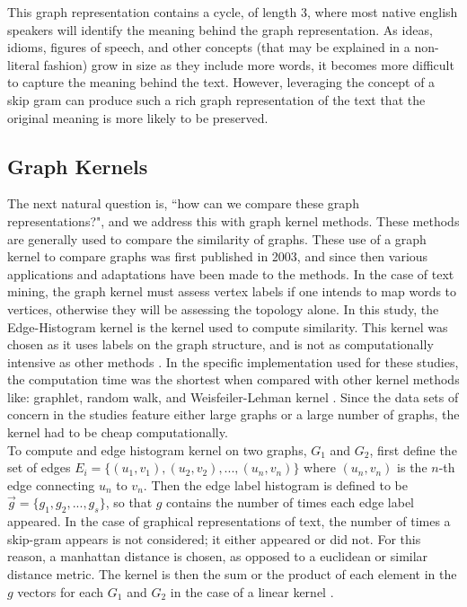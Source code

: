 This graph representation contains a cycle, of length 3, where most native english speakers will identify the meaning behind the graph representation. As ideas, idioms, figures of speech, and other concepts (that may be explained in a non-literal fashion) grow in size as they include more words, it becomes more difficult to capture the meaning behind the text. However, leveraging the concept of a skip gram can produce such a rich graph representation of the text that the original meaning is more likely to be preserved. \\

\subsection{ Graph Kernels}
\hspace*{0.3cm} The next natural question is, ``how can we compare these graph representations?", and we address this with graph kernel methods. These methods are generally used to compare the similarity of graphs. These use of a graph kernel to compare graphs was first published in 2003, and since then various applications and adaptations have been made to the methods. In the case of text mining, the graph kernel must assess vertex labels \textemdash if one intends to map words to vertices, otherwise they will be assessing the topology alone. In this study, the Edge-Histogram kernel is the kernel used to compute similarity. This kernel was chosen as it uses labels on the graph structure, and is not as computationally intensive as other methods \cite{sugiyama2015halting}. In the specific implementation used for these studies, the computation time was the shortest when compared with other kernel methods like: graphlet, random walk, and Weisfeiler-Lehman kernel \cite{sugiyama2015halting}. Since the data sets of concern in the studies feature either large graphs or a large number of graphs, the kernel had to be cheap computationally.\\

To compute and edge histogram kernel on two graphs, $G_1$ and $G_2$, first define the set of edges $E_i =\{ (u_1,v_1), (u_2,v_2), ... , (u_n,v_n) \}$ where $(u_n,v_n)$ is the $n$-th edge connecting $u_n$ to $v_n$. Then the edge label histogram is defined to be $\vec{g} = \{ g_1, g_2, ... , g_s\}$, so that $g$ contains the number of times each edge label appeared. In the case of graphical representations of text, the number of times a skip-gram appears is not considered; it either appeared or did not. For this reason, a manhattan distance is chosen, as opposed to a euclidean or similar distance metric. The kernel is then the sum or the product of each element in the $g$ vectors for each $G_1$ and $G_2$ in the case of a linear kernel \cite{sugiyama2015halting}.



